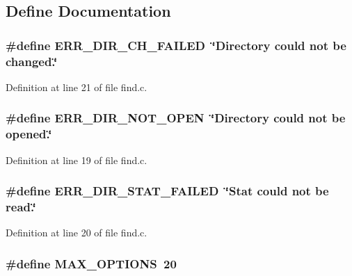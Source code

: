 \subsection{Define Documentation}
\subsubsection[{ERR\_\-DIR\_\-CH\_\-FAILED}]{\setlength{\rightskip}{0pt plus 5cm}\#define ERR\_\-DIR\_\-CH\_\-FAILED~\char`\"{}Directory could not be changed.\char`\"{}}\label{find_8c_a7b5ab6fa34997701de7e7226baa1aa4f}


Definition at line 21 of file find.c.

\subsubsection[{ERR\_\-DIR\_\-NOT\_\-OPEN}]{\setlength{\rightskip}{0pt plus 5cm}\#define ERR\_\-DIR\_\-NOT\_\-OPEN~\char`\"{}Directory could not be opened.\char`\"{}}\label{find_8c_a8627a6b2a357c1ed5e0bcf13fd11a6d8}


Definition at line 19 of file find.c.

\subsubsection[{ERR\_\-DIR\_\-STAT\_\-FAILED}]{\setlength{\rightskip}{0pt plus 5cm}\#define ERR\_\-DIR\_\-STAT\_\-FAILED~\char`\"{}Stat could not be read.\char`\"{}}\label{find_8c_a3f9cf44f4c1f17cacc23877392cfe267}


Definition at line 20 of file find.c.

\subsubsection[{MAX\_\-OPTIONS}]{\setlength{\rightskip}{0pt plus 5cm}\#define MAX\_\-OPTIONS~20}\label{find_8c_a7433aa656288775b4d203ec4ed5865fa}


